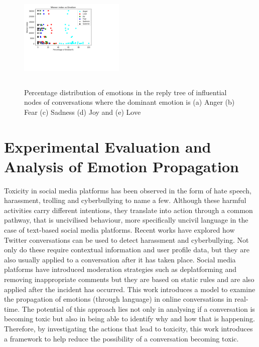 \documentclass[acmtog]{acmart}
\begin{document}
\begin{figure}[h]
\begin{minipage}{.33\textwidth}
  \end{minipage}%
  \begin{minipage}{.33\textwidth}
    \centering
    \includegraphics[width=5cm,height=5cm,keepaspectratio]{WAnger.pdf}
  \end{minipage}
  
  \caption{Percentage distribution of emotions in the reply tree of influential nodes of conversations where the dominant emotion is (a) Anger (b) Fear (c) Sadness (d) Joy and (e) Love}
  \label{SampleConv}
  \end{figure}
\section{Experimental Evaluation and Analysis of Emotion Propagation}
Toxicity in social media platforms has been observed in the form of hate speech, harassment, trolling and cyberbullying to name a few.  Although these harmful activities carry different intentions, they translate into action through a common pathway, that is uncivilised behaviour, more specifically uncivil language in the case of text-based social media platforms. Recent works have explored how Twitter conversations can be used to detect harassment and cyberbullying. Not only do these require contextual information and user profile data, but they are also usually applied to a conversation after it has taken place. Social media platforms have introduced moderation strategies such as deplatforming and removing inappropriate comments but they are based on static rules and are also applied after the incident has occurred. This work introduces a model to examine the propagation of emotions (through language) in online conversations in real-time. The potential of this approach lies not only in analysing if a conversation is becoming toxic but also in being able to identify why and how that is happening. Therefore, by investigating the actions that lead to toxicity, this work introduces a framework to help reduce the possibility of a conversation becoming toxic.  
\end{document}
